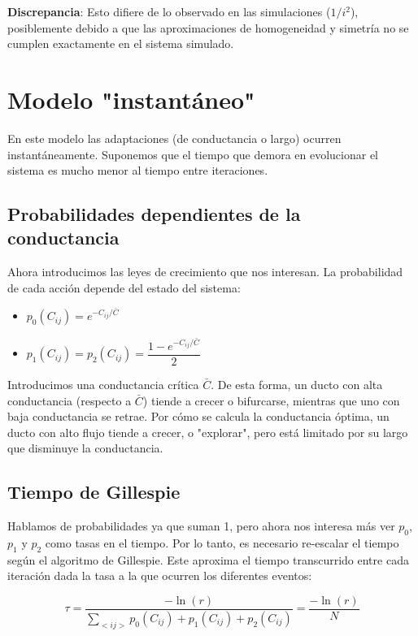 \documentclass{article}
\begin{document}
\textbf{Discrepancia}: Esto difiere de lo observado en las simulaciones ($1/i^2$), posiblemente debido a que las aproximaciones de homogeneidad y simetría no se cumplen exactamente en el sistema simulado.

\section{Modelo "instantáneo"}

En este modelo las adaptaciones (de conductancia o largo) ocurren instantáneamente. Suponemos que el tiempo que demora en evolucionar el sistema es mucho menor al tiempo entre iteraciones.

\subsection{Probabilidades dependientes de la conductancia}

Ahora introducimos las leyes de crecimiento que nos interesan. La probabilidad de cada acción depende del estado del sistema:

\begin{itemize}
    \item $p_0(C_{ij}) = e^{-C_{ij}/\bar{C}}$
    \item $p_1(C_{ij}) = p_2(C_{ij}) = \dfrac{1 - e^{-C_{ij}/\bar{C}}}{2}$
\end{itemize}

Introducimos una conductancia crítica $\bar{C}$. De esta forma, un ducto con alta conductancia (respecto a $\bar C$) tiende a crecer o bifurcarse, mientras que uno con baja conductancia se retrae. Por cómo se calcula la conductancia óptima, un ducto con alto flujo tiende a crecer, o "explorar", pero está limitado por su largo que disminuye la conductancia.

\subsection{Tiempo de Gillespie}

Hablamos de probabilidades ya que suman 1, pero ahora nos interesa más ver $p_0$, $p_1$ y $p_2$ como tasas en el tiempo. Por lo tanto, es necesario re-escalar el tiempo según el algoritmo de Gillespie. Este aproxima el tiempo transcurrido entre cada iteración dada la tasa a la que ocurren los diferentes eventos:

$$ \tau = \frac{-\ln(r)}{\sum_{<ij>}p_0(C_{ij}) + p_1(C_{ij}) + p_2(C_{ij})} = \frac{-\ln(r)}{N}$$
\end{document}
